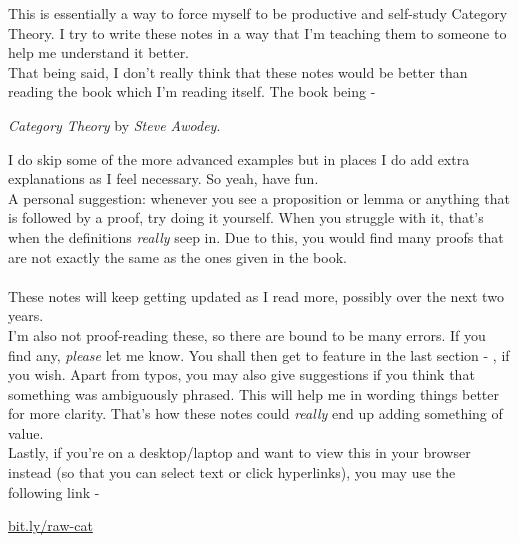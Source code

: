 This is essentially a way to force myself to be productive and self-study Category Theory. I try to write these notes in a way that I'm teaching them to someone to help me understand it better.\\
That being said, I don't really think that these notes would be better than reading the book which I'm reading itself. The book being - 
\begin{center}
	\emph{Category Theory} by \emph{Steve Awodey}.
\end{center}
I do skip some of the more advanced examples but in places I do add extra explanations as I feel necessary. So yeah, have fun.\\
A personal suggestion: whenever you see a proposition or lemma or anything that is followed by a proof, try doing it yourself. When you struggle with it, that's when the definitions \emph{really} seep in. Due to this, you would find many proofs that are not exactly the same as the ones given in the book. \\~\\
These notes will keep getting updated as I read more, possibly over the next two years.\\
I'm also not proof-reading these, so there are bound to be many errors. If you find any, \emph{please} let me know. You shall then get to feature in the last section - , if you wish. Apart from typos, you may also give suggestions if you think that something was ambiguously phrased. This will help me in wording things better for more clarity. That's how these notes could \emph{really} end up adding something of value.\\
Lastly, if you're on a desktop/laptop and want to view this in your browser instead (so that you can select text or click hyperlinks), you may use the following link - 
\begin{center}
	\url{bit.ly/raw-cat}
\end{center}